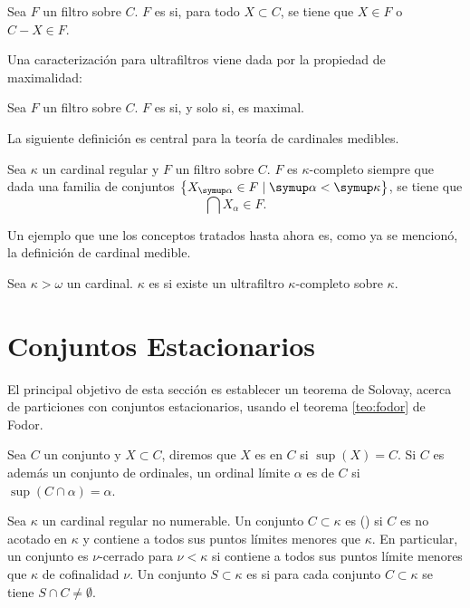 \begin{defi}
    Sea $F$ un filtro sobre $C$. $F$ es  si, para todo $X\subset C$,
    se tiene que $X\in F$ o $C-X\in F$.
\end{defi}

Una caracterización para ultrafiltros viene dada por la propiedad
de maximalidad:

\begin{teo}
    Sea $F$ un filtro sobre $C$. $F$ es  si, y solo si, es maximal.
\end{teo}

La siguiente definición es central para la teoría de cardinales medibles.

\begin{defi}
    Sea $\kappa$ un cardinal regular y $F$ un filtro sobre $C$.
    $F$ es $\kappa$-completo siempre que dada una familia de conjuntos
    $\set{X_\alpha\in F\mid \alpha<\kappa}$,
    se tiene que
    \[
        \bigcap X_\alpha \in F.
    \]
\end{defi}

Un ejemplo que une los conceptos tratados hasta ahora es, como ya se mencionó,
la definición de cardinal medible.

\begin{defi}
    Sea $\kappa > \omega$ un cardinal. $\kappa$ es  si existe
    un ultrafiltro $\kappa\text{-completo}$ sobre $\kappa$.
\end{defi}

\section{Conjuntos Estacionarios}

El principal objetivo de esta sección es establecer un teorema
de Solovay, acerca de particiones
con conjuntos estacionarios, usando el teorema \ref{teo:fodor}
de Fodor.

Sea $C$ un conjunto y $X\subset C$, diremos que $X$ es 
en $C$ si $\sup(X) = C$.
Si $C$ es además un conjunto de ordinales, un ordinal límite $\alpha$ es
 de $C$ si $\sup ( C \cap\alpha ) = \alpha$.
\begin{defi}
    Sea $\kappa$ un cardinal regular no numerable. Un conjunto $C\subset \kappa$
    es  (\cna) si $C$ es no acotado en $\kappa$ y contiene a
    todos sus puntos límites menores que $\kappa$. En particular, un conjunto es $\nu$-cerrado
    para $\nu<\kappa$ si contiene a todos sus puntos límite menores que $\kappa$ de cofinalidad $\nu$.
    Un conjunto $S\subset\kappa$ es  si para cada conjunto
    \cna{} $C\subset\kappa$ se tiene $S\cap C\neq\emptyset$.
\end{defi}

